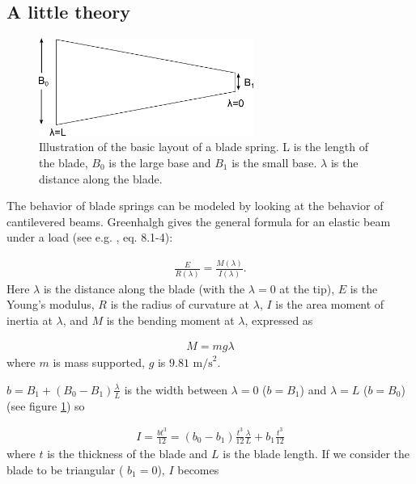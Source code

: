 \subsection{A little theory}
\label{sec:theory}

\begin{figure}[ht]		
\centering
\includegraphics[width=7cm]{figures/suspensions/bladeWidth.png}
	\caption[Blade spring illustration]{Illustration of the basic layout of a blade spring. L is the length of the blade, $B_0$ is the large base and $B_1$ is the small base. $\lambda$ is the distance along the blade.}
	\label{fig:bladeIllustration}
\end{figure}

The behavior of blade springs can be modeled by looking at the behavior of cantilevered beams. Greenhalgh gives the general formula for an elastic beam under a load (see e.g. \cite{Rourke}, eq. 8.1-4):

\begin{eqnarray}
\frac{E}{R(\lambda)} = \frac{M(\lambda)}{I(\lambda)}.
\label{eq:R}
\end{eqnarray}
Here $\lambda$ is the distance along the blade (with the $\lambda=0$ at the tip), $E$ is the Young's modulus, $R$ is the radius of curvature at $\lambda$, $I$ is the area moment of inertia at $\lambda$, and $M$ is the bending moment at $\lambda$, expressed as 

\begin{eqnarray}
M = m g \lambda
\label{eq:M}
\end{eqnarray}
where $m$ is mass supported, $g$ is $9.81 \mbox{ m/s}^2$.

$b = B_1+(B_0-B_1) \frac{\lambda}{L}$ is the width between $\lambda=0$ ($b=B_1$) and $\lambda=L$ ($b=B_0$) (see figure \ref{fig:bladeIllustration}) so

\begin{eqnarray}
I = \frac{b t^3}{12} = (b_0-b_1)\frac{t^3}{12} \frac{\lambda}{L}+b_1\frac{t^3}{12}
\label{eq:I1}
\end{eqnarray}
where $t$ is the thickness of the blade and $L$ is the blade length.  If we consider the blade to be triangular ( $b_1=0$), $I$ becomes

